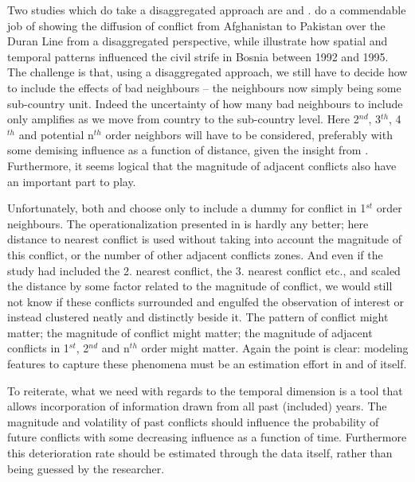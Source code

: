 \documentclass[a4paper]{article}
\begin{document}
Two studies which do take a disaggregated approach are \cite{ol2010afghanistan} and \cite{weidmann_ward_2010predicting}. \cite{ol2010afghanistan} do a commendable job of showing the diffusion of conflict from Afghanistan to Pakistan over the Duran Line from a disaggregated perspective, while \cite{weidmann_ward_2010predicting} illustrate how spatial and temporal patterns influenced the civil strife in Bosnia between 1992 and 1995. The challenge is that, using a disaggregated approach, we still have to decide how to include the effects of bad neighbours -- the neighbours now simply being some sub-country unit. Indeed the uncertainty of how many bad neighbours to include only amplifies as we move from country to the sub-country level. Here 2$^{nd}$, 3$^{th}$, 4$^{th}$ and potential n$^{th}$ order neighbors will have to be considered, preferably with some demising influence as a function of distance, given the insight from \cite{schutte2011diffusion}. Furthermore, it seems logical that the magnitude of adjacent conflicts also have an important part to play.\par

Unfortunately, both \cite{ol2010afghanistan} and \cite{weidmann_ward_2010predicting} choose only to include a dummy for conflict in 1$^{st}$ order neighbours. The operationalization presented in \cite{Maase} is hardly any better; here distance to nearest conflict is used without taking into account the magnitude of this conflict, or the number of other adjacent conflicts zones. And even if the study had included the 2. nearest conflict, the 3. nearest conflict etc., and scaled the distance by some factor related to the magnitude of conflict, we would still not know if these conflicts surrounded and engulfed the observation of interest or instead clustered neatly and distinctly beside it. The pattern of conflict might matter; the magnitude of conflict might matter; the magnitude of adjacent conflicts in 1$^{st}$, 2$^{nd}$ and n$^{th}$ order might matter. Again the point is clear: modeling features to capture these phenomena must be an estimation effort in and of itself.\par

To reiterate, what we need with regards to the temporal dimension is a tool that allows incorporation of information drawn from all past (included) years. The magnitude and volatility of past conflicts should influence the probability of future conflicts with some decreasing influence as a function of time. Furthermore this deterioration rate should be estimated through the data itself, rather than being guessed by the researcher.\par
\end{document}

